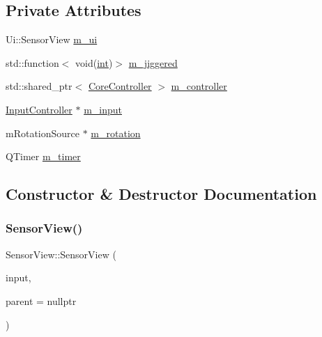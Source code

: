 \subsection*{Private Attributes}
\begin{DoxyCompactItemize}
\item 
Ui\+::\+Sensor\+View \mbox{\hyperlink{class_q_g_b_a_1_1_sensor_view_afb7afd03aacdba7deada6ce9481552f2}{m\+\_\+ui}}
\item 
std\+::function$<$ void(\mbox{\hyperlink{ioapi_8h_a787fa3cf048117ba7123753c1e74fcd6}{int}})$>$ \mbox{\hyperlink{class_q_g_b_a_1_1_sensor_view_af8c4a7add1c4ab506e7a53db6eafedd0}{m\+\_\+jiggered}}
\item 
std\+::shared\+\_\+ptr$<$ \mbox{\hyperlink{class_q_g_b_a_1_1_core_controller}{Core\+Controller}} $>$ \mbox{\hyperlink{class_q_g_b_a_1_1_sensor_view_a52ee47a033d621a39ea6112f2a1573c4}{m\+\_\+controller}}
\item 
\mbox{\hyperlink{class_q_g_b_a_1_1_input_controller}{Input\+Controller}} $\ast$ \mbox{\hyperlink{class_q_g_b_a_1_1_sensor_view_a63f23abbafe3aa495edf52a786329052}{m\+\_\+input}}
\item 
m\+Rotation\+Source $\ast$ \mbox{\hyperlink{class_q_g_b_a_1_1_sensor_view_aff3e71b31a52e2dc432f014b3a101541}{m\+\_\+rotation}}
\item 
Q\+Timer \mbox{\hyperlink{class_q_g_b_a_1_1_sensor_view_a1cdba6194ed17cfe40947c059982cc03}{m\+\_\+timer}}
\end{DoxyCompactItemize}


\subsection{Constructor \& Destructor Documentation}
\mbox{\label{class_q_g_b_a_1_1_sensor_view_a35d0e03e33ccb200c6c20c22db1950cd}} 
\subsubsection{\texorpdfstring{Sensor\+View()}{SensorView()}}
{\footnotesize\ttfamily Sensor\+View\+::\+Sensor\+View (\begin{DoxyParamCaption}\item[{\mbox{\hyperlink{class_q_g_b_a_1_1_input_controller}{Input\+Controller}} $\ast$}]{input,  }\item[{Q\+Widget $\ast$}]{parent = {\ttfamily nullptr} }\end{DoxyParamCaption})}


